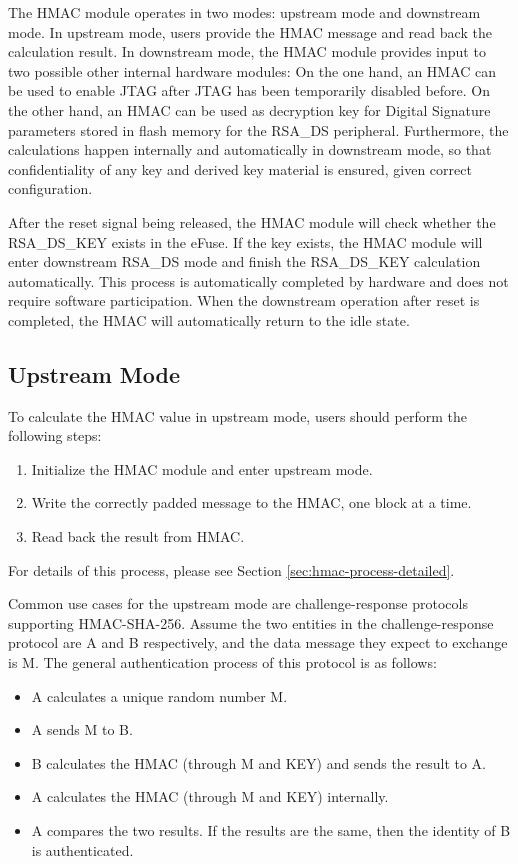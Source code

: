 \documentclass[main\_\_EN.tex]{subfiles}
\begin{document}
The HMAC module operates in two modes: upstream mode and downstream mode. In upstream mode, users provide the HMAC message and read back the calculation result. In downstream mode, the HMAC module provides input to two possible other internal hardware modules: On the one hand, an HMAC can be used to enable JTAG after JTAG has been temporarily disabled before. On the other hand, an HMAC can be used as decryption key for Digital Signature parameters stored in flash memory for the RSA\_DS peripheral. Furthermore, the calculations happen internally and automatically in downstream mode, so that confidentiality of any key and derived key material is ensured, given correct configuration.
\begin{tiplisting}
After the reset signal being released, the HMAC module will check whether the RSA\_DS\_KEY exists in the eFuse. If the key exists, the HMAC module will enter downstream RSA\_DS mode and finish the RSA\_DS\_KEY calculation automatically. This process is automatically completed by hardware and does not require software participation. When the downstream operation after reset is completed, the HMAC will automatically return to the idle state.
\end{tiplisting}

\subsection{Upstream Mode}
To calculate the HMAC value in upstream mode, users should perform the following steps:

\begin{enumerate}
    \item Initialize the HMAC module and enter upstream mode.
    \item Write the correctly padded message to the HMAC, one block at a time.
    \item Read back the result from HMAC.
\end{enumerate}

For details of this process, please see Section \ref{sec:hmac-process-detailed}.

\begin{tiplisting}
Common use cases for the upstream mode are challenge-response protocols supporting HMAC-SHA-256. Assume the two entities in the challenge-response protocol are A and B respectively, and the data message they expect to exchange is M. The general authentication process of this protocol is as follows:

\begin{itemize}
    \item A calculates a unique random number M.
    \item A sends M to B.
    \item B calculates the HMAC (through M and KEY) and sends the result to A.
    \item A calculates the HMAC (through M and KEY) internally.
    \item A compares the two results. If the results are the same, then the identity of B is authenticated.
\end{itemize}
\end{tiplisting}
\end{document}
